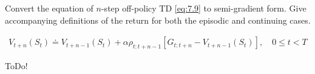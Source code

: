 
\begin{exercise}

Convert the equation of $n$-step off-policy TD \eqref{eq:7.9} to semi-gradient form.
Give accompanying definitions of the return for both the episodic and continuing cases.

\begin{align} \label{eq:7.9} \tag{7.9}
    V_{t+n}(S_t)
    \doteq
    V_{t+n-1}(S_t)
    +
    \alpha \rho_{t:t+n-1} [G_{t:t+n} - V_{t+n-1}(S_t)],
    \quad
    0 \leq t < T
\end{align}


\end{exercise}


\begin{solution}

ToDo!

\end{solution}

